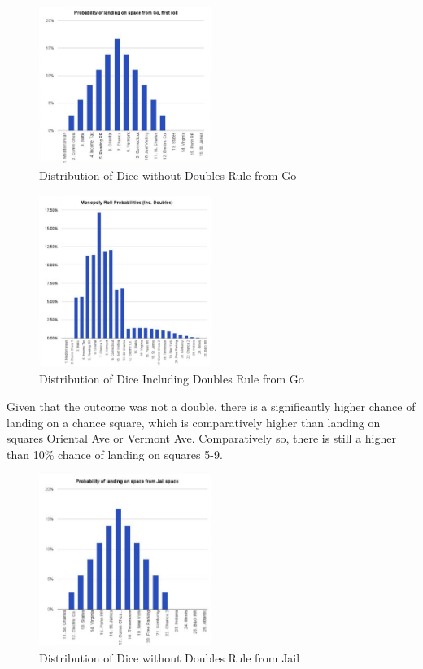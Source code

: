 \documentclass[12pt]{article}
\begin{document}
\begin{figure}[h]
\centering
\includegraphics[width=0.5\textwidth]{non_doubles_go.png}
\caption{Distribution of Dice without Doubles Rule from Go}
\end{figure}
\begin{figure}[h]
\centering
\includegraphics[width=0.5\textwidth]{incl_doubles_go.png}
\caption{Distribution of Dice Including Doubles Rule from Go}
\end{figure}
Given that the outcome was not a double, there is a significantly higher chance of landing on a chance square, which is comparatively higher than landing on squares Oriental Ave or Vermont Ave. Comparatively so, there is still a higher than 10\% chance of landing on squares 5-9.
\begin{figure}[h]
\centering
\includegraphics[width=0.5\textwidth]{non_doubles_jail.png}
\caption{Distribution of Dice without Doubles Rule from Jail}
\end{figure}
\end{document}
